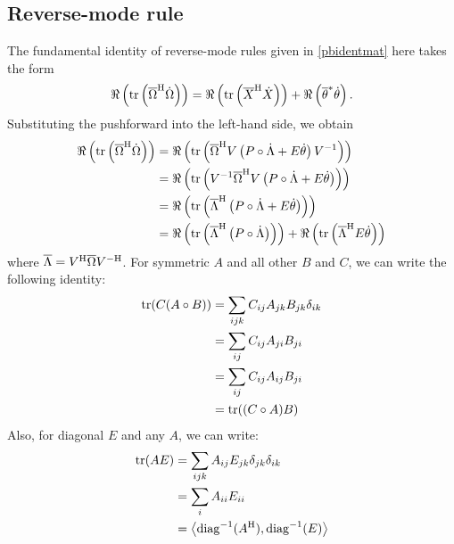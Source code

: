 \documentclass[../main.tex]{subfiles}
\begin{document}
\begin{refsection}
\section{Reverse-mode rule}\label{reverse-mode-rule-1}

The fundamental identity of reverse-mode rules given in \eqref{pbidentmat} here takes the form
\begin{equation*}
\Re \left( \operatorname{tr} \left( {\overline{\Omega}}^\mathrm{H} \dot{\Omega} \right) \right) =
\Re \left( \operatorname{tr} \left( {\overline{X}}^\mathrm{H}      \dot{X}      \right) \right) +
\Re \left( {\overline{\theta}}^* \dot{\theta}  \right).
\end{equation*}
Substituting the pushforward into the left-hand side, we obtain
\begin{align*}
\Re \left( \operatorname{tr} \left( {\overline{\Omega}}^\mathrm{H} \dot{\Omega} \right) \right)
  &= \Re \left( \operatorname{tr} \left( {\overline{\Omega}}^\mathrm{H} V \left( P \circ \dot{\Lambda} + E \dot{\theta} \right) V^{-1} \right) \right)\\
  &= \Re \left( \operatorname{tr} \left( V^{-1} {\overline{\Omega}}^\mathrm{H} V \left( P \circ \dot{\Lambda} + E \dot{\theta} \right) \right) \right)\\
  &= \Re \left( \operatorname{tr} \left( {\overline{\Lambda}}^\mathrm{H} \left( P \circ \dot{\Lambda} + E \dot{\theta} \right) \right) \right)\\
  &= \Re \left( \operatorname{tr} \left( {\overline{\Lambda}}^\mathrm{H} \left( P \circ \dot{\Lambda} \right) \right) \right) +
     \Re \left( \operatorname{tr} \left( {\overline{\Lambda}}^\mathrm{H} E \dot{\theta} \right) \right)
\end{align*}
where $\overline{\Lambda} = {V}^\mathrm{H} \overline{\Omega} {V}^{-\mathrm{H}}$.
For symmetric $A$ and all other $B$ and $C$, we can write the following identity:
\begin{align*}
\operatorname{tr}(C (A \circ B)) &= \sum_{ijk} C_{ij} A_{jk} B_{jk} \delta_{ik}\\
                   &= \sum_{ij} C_{ij} A_{ji} B_{ji}\\
                   &= \sum_{ij} C_{ij} A_{ij} B_{ji}\\
                   &= \operatorname{tr}((C \circ A) B)
\end{align*}
Also, for diagonal $E$ and any $A$, we can write:
\begin{align*}
\operatorname{tr}(A E) &= \sum_{ijk} A_{ij} E_{jk} \delta_{jk} \delta_{ik}\\
         &= \sum_i A_{ii} E_{ii}\\
         &= \left\langle \operatorname{diag}^{-1}({A}^\mathrm{H}), \operatorname{diag}^{-1}(E) \right\rangle
\end{align*}

\end{refsection}
\end{document}
